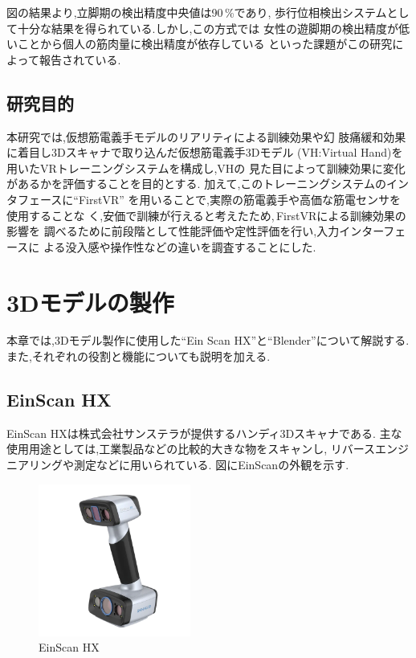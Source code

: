 \documentclass{ltjsreport}
\begin{document}
		図の結果より,立脚期の検出精度中央値は90\,\%であり,
		歩行位相検出システムとして十分な結果を得られている.しかし,この方式では
		女性の遊脚期の検出精度が低いことから個人の筋肉量に検出精度が依存している
		といった課題がこの研究によって報告されている.

		\section{研究目的}
		本研究では,仮想筋電義手モデルのリアリティによる訓練効果や幻
		肢痛緩和効果に着目し3Dスキャナで取り込んだ仮想筋電義手3Dモデル
		(VH:Virtual Hand)を用いたVRトレーニングシステムを構成し,VHの
		見た目によって訓練効果に変化があるかを評価することを目的とする.
		加えて,このトレーニングシステムのインタフェースに``FirstVR''\cite{ref:5}
		を用いることで,実際の筋電義手や高価な筋電センサを使用することな
		く,安価で訓練が行えると考えたため,\,FirstVRによる訓練効果の影響を
		調べるために前段階として性能評価や定性評価を行い,入力インターフェースに
		よる没入感や操作性などの違いを調査することにした.


\chapter{3Dモデルの製作}
	本章では,3Dモデル製作に使用した``Ein Scan HX''と``Blender''について解説する.
	また,それぞれの役割と機能についても説明を加える.

	\section{EinScan HX}
		EinScan HX\cite{ref:4}は株式会社サンステラが提供するハンディ3Dスキャナである.
		主な使用用途としては,工業製品などの比較的大きな物をスキャンし,
		リバースエンジニアリングや測定などに用いられている.
		図にEinScanの外観を示す.

		\begin{figure}[H]
		\centering
		\includegraphics[width = 5cm]{../figs/EinScan.png}
		\hspace{-32truemm}
		\caption{EinScan HX}
		\label{fig:EinScan}
		\end{figure}
\vspace{-15pt}
\end{document}
